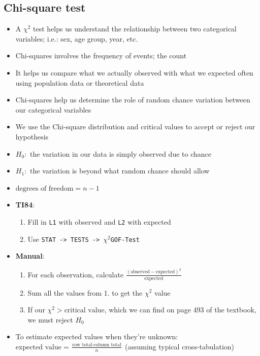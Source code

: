 \documentclass{article}
\newcommand{\code}[1]{\colorbox{light-gray}{\texttt{#1}}}
\begin{document}
\subsection{Chi-square test}

\begin{itemize}
    \item A $\chi ^2$ test helps us understand the relationship between two categorical variables; i.e.: sex, age group, year, etc.
    \item Chi-squares involves the frequency of events; the count
    \item It helps us compare what we actually observed with what we expected often using population data or theoretical data
    \item Chi-squares help us determine the role of random chance variation between our categorical variables
    \item We use the Chi-square distribution and critical values to accept or reject our hypothesis
    \item $H_0: $ the variation in our data is simply observed due to chance
    \item $H_1: $ the variation is beyond what random chance should allow
    \item $\text{degrees of freedom} = n-1$
    \item \textbf{TI84}:
    \begin{enumerate}
        \item Fill in \code{L1} with observed and \code{L2} with expected
        \item Use \code{STAT -> TESTS -> $\chi^2$GOF-Test}
    \end{enumerate}
    \item \textbf{Manual}:
    \begin{enumerate}
        \item For each observation, calculate 
        $\frac{(\text{observed} - \text{expected})^2}{\text{expected}}$
        \item Sum all the values from 1. to get the $\chi^2$ value
        \item If our $\chi^2>\text{critical value}$, which we can find on page 493 of the textbook, we must reject $H_0$
    \end{enumerate}
    \item To estimate expected values when they're unknown: $\text{expected value} = \frac{\text{row total} \cdot \text{column total}}{n}$ (assuming typical cross-tabulation)
\end{itemize}
\end{document}

